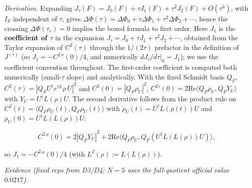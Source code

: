 \documentclass[
]{article}
\begin{document}
\emph{Derivation.} Expanding
\(J_\tau(F) = J_0(F) + \tau J_1(F) + \tau^2 J_2(F) +
O(\tau^3)\), with \(I_F\) independent of \(\tau\), gives
\(\Delta\Phi(\tau) = \Delta\Phi_0 + \tau\Delta\Phi_1 + \tau^2\Delta\Phi_2
+ \cdots\), hence the crossing \(\Delta\Phi(\tau_c)=0\) implies the
boxed formula to first order. Here \(J_1\) is the \textbf{coefficient of
\(\tau\)} in the expansion
\(J_\tau = J_0 + \tau J_1 + \tau^2 J_2 + \cdots\), obtained from the
Taylor expansion of \(C^2(\tau)\) through the \(1/(2\tau)\) prefactor in
the definition of \(J^{(\tau)}\) (so \(J_1 = -C^2{}''(0)/4\), and
numerically \(dJ_\tau/d\tau|_0 = J_1\)); we use the coefficient
convention throughout. The first-order coefficient is computed both
numerically (small-\(\tau\) slope) and analytically. With the fixed
Schmidt basis \(Q_F\),
\(C^2(\tau) = |Q_F U^\dagger e^{\tau L}\rho\, U|^2\) and
\(C^2(0) = |Q_F\rho_U|^2\), \(C^2{}'(0) = 2\mathrm{Re}\langle Q_F\rho_U,
Q_F Y_U\rangle\) with \(Y_U = U^\dagger L(\rho) U\). The second
derivative follows from the product rule on
\(C^2(t) = \langle Q_F\rho_U(t),
Q_F\rho_U(t)\rangle\) with \(\dot\rho_U(t) = U^\dagger L(\rho(t))U\) and
\(\ddot\rho_U(0) = U^\dagger L(L(\rho))U\):

\[C^2{}''(0) = 2|Q_F Y_U|^2 + 2\mathrm{Re}\langle Q_F\rho_U,
Q_F(U^\dagger L(L(\rho)) U)\rangle,\]

so \(J_1 = -C^2{}''(0)/4\) (with \(L^2(\rho) := L(L(\rho))\)).

\emph{Evidence (fixed reps from D3/D4; \(N=5\) uses the full-quotient
official value \(0.0217\)).}
\end{document}

